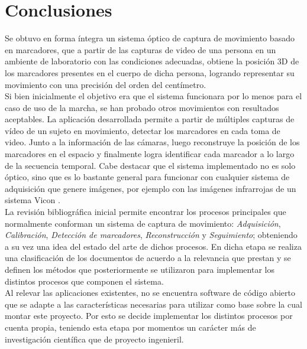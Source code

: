 \chapter{Conclusiones}
\label{conclusiones}

Se obtuvo en forma íntegra un sistema óptico de captura de movimiento basado en marcadores, que a partir de las capturas de video de una persona en un ambiente de laboratorio con las condiciones adecuadas, obtiene la posición 3D de  los marcadores presentes en el cuerpo de dicha persona, logrando representar su movimiento con una precisión del orden del centímetro.\\


Si bien inicialmente el objetivo era que el sistema funcionara por lo menos para el caso de uso de la marcha, se han probado otros  movimientos con resultados aceptables. La aplicación desarrollada permite a partir de múltiples capturas de vídeo de un sujeto en movimiento, detectar los marcadores en cada toma de video. Junto a la información de las cámaras, luego reconstruye la posición de los marcadores en el espacio y finalmente logra identificar cada marcador a lo largo de la secuencia temporal. Cabe destacar que el sistema implementado no es solo óptico, sino que es lo bastante general para funcionar con cualquier sistema de adquisición que genere imágenes, por ejemplo con las imágenes infrarrojas de un sistema Vicon \cite{vicon}. \\ 


La revisión bibliográfica inicial permite encontrar los procesos principales que normalmente conforman un sistema de captura de movimiento: \emph{Adquisición}, \emph{Calibración}, \emph{Detección de marcadores}, \emph{Reconstrucción} y \emph{Seguimiento};  obteniendo a su vez una idea del estado del arte de dichos procesos. En dicha etapa se realiza una clasificación de los documentos de acuerdo a la relevancia que prestan y se definen los métodos que posteriormente se utilizaron para implementar los distintos procesos que componen el sistema. \\  

Al relevar las aplicaciones existentes, no se encuentra software de código abierto que se adapte a las características necesarias para utilizar como base sobre la cual montar este proyecto. Por esto se decide implementar los distintos procesos por cuenta propia, teniendo esta etapa por momentos un carácter más de investigación científica que de proyecto ingenieril.\\

